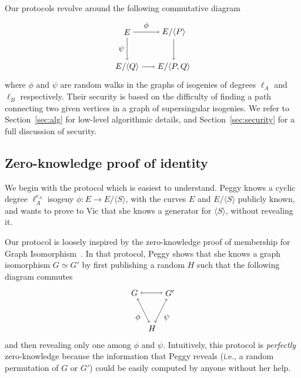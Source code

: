 \documentclass[jmc]{degruyter-journal-a}
\theoremstyle{definition}
\newcommand{\cyc}[1]{{\langle #1 \rangle}}
\begin{document}
Our protocols revolve around the following commutative diagram
\begin{equation}
  \label{eq:square}
  \begin{tikzpicture}[xscale=2,yscale=1.5,baseline=(current bounding box.east)]
    \node(0) at (0,0) {$E$};
    \node(S) at (1,0) {$E/\cyc{P}$};
    \node(R) at (0,-1) {$E/\cyc{Q}$};
    \node(SR) at (1,-1) {$E/\cyc{P,Q}$};
    \path[->] (0) edge node[auto] {$\phi$} (S);
    \path[->] (0) edge node[auto,swap] {$\psi$} (R);
    \path[->] (S) edge (SR);
    \path[->] (R) edge (SR);
  \end{tikzpicture}
\end{equation}
where $\phi$ and $\psi$ are random walks in the graphs of isogenies of
degrees $\ell_A$ and $\ell_B$ respectively. Their security is based on
the difficulty of finding a path connecting two given vertices in a
graph of supersingular isogenies. We refer to Section~\ref{sec:alg}
for low-level algorithmic details, and Section~\ref{sec:security} for
a full discussion of security.

\subsection{Zero-knowledge proof of identity}\label{subsec:zk}

We begin with the protocol which is easiest to understand. Peggy
knows a cyclic degree $\ell_A^{e_A}$ isogeny $\phi:E \to E/\cyc{S}$,
with the curves $E$ and $E/\cyc{S}$ publicly known, and wants to prove to
Vic that she knows a generator for $\cyc{S}$, without revealing it.

Our protocol is loosely inspired by the zero-knowledge proof of
membership for Graph
Isomorphism~\cite{goldreich+micali+widgerson91}. In that protocol,
Peggy shows that she knows a graph isomorphism $G \simeq G'$ by first
publishing a random $H$ such that the following diagram commutes
\begin{equation}
  \label{eq:gi}
  \begin{tikzpicture}[xscale=1.5,yscale=1.5,baseline=(current bounding box.east)]
    \node(G) at (0,0) {$G$};
    \node(G') at (1,0) {$G'$};
    \node(H) at (0.5,-1) {$H$};
    \path[<->] (G) edge (G');
    \path[<->] (G) edge node[auto,swap] {$\phi$} (H);
    \path[<->] (G') edge node[auto] {$\psi$} (H);
  \end{tikzpicture}  
\end{equation}
and then revealing only one among $\phi$ and $\psi$. Intuitively, this
protocol is \emph{perfectly} zero-knowledge because the information
that Peggy reveals (i.e., a random permutation of $G$ or $G'$) could
be easily computed by anyone without her help.
\end{document}
